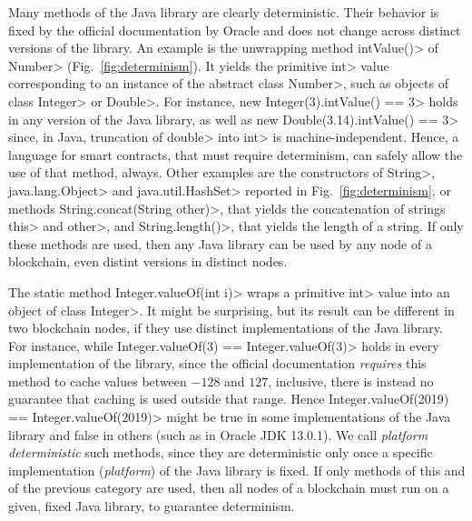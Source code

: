 Many methods of the Java library are clearly deterministic. Their behavior is fixed
by the official documentation by Oracle
and does not change across distinct versions of the library. An example is the unwrapping
method \<intValue()> of \<Number> (Fig.~\ref{fig:determinism}). It yields
the primitive \<int> value corresponding to an instance of the abstract class \<Number>, such
as objects of class \<Integer> or \<Double>. For instance,
\<new Integer(3).intValue() == 3>
holds in any version of the Java library, as well as
\<new Double(3.14).intValue() == 3>
since, in Java, truncation of \<double> into \<int> is machine-independent.
Hence, a language for smart contracts, that must require determinism,
can safely allow the use of that method, always. Other examples
are the constructors of \<String>, \<java.lang.Object> and \<java.util.HashSet>
reported in Fig.~\ref{fig:determinism}, or methods
\<String.concat(String other)>, that yields the concatenation of strings \<this> and \<other>,
and \<String.length()>, that yields the length of a string.
If only these methods are used, then any Java library can be used by any node of a blockchain,
even distint versions in distinct nodes.

The static method \<Integer.valueOf(int i)> wraps
a primitive \<int> value into an object of class \<Integer>. It might be surprising,
but its result can be different in two blockchain nodes, if they
use distinct implementations of the Java library. For instance, while
\<Integer.valueOf(3) == Integer.valueOf(3)>
holds in every implementation of the library, since the official documentation \emph{requires} this method
to cache values between $-128$ and $127$, inclusive, there is instead no guarantee that caching is
used outside that range. Hence
\<Integer.valueOf(2019) == Integer.valueOf(2019)>
might be true in some implementations of the Java library
and false in others (such as in Oracle JDK 13.0.1). %
We call \emph{platform deterministic} such methods, since they are deterministic only once a specific
implementation (\emph{platform}) of the Java library is fixed.
If only methods of this and of the previous category are used, then
all nodes of a blockchain must run on a given, fixed Java library, to guarantee
determinism. %

